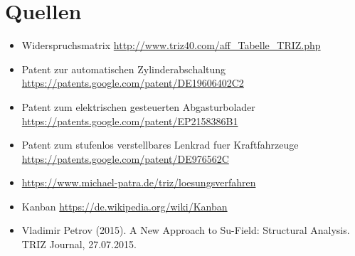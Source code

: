 \documentclass[11pt,a4paper]{article}
\begin{document}
\section{Quellen}

\begin{itemize}
\item {Widerspruchsmatrix}
  \url{http://www.triz40.com/aff_Tabelle_TRIZ.php}
\item {Patent zur automatischen Zylinderabschaltung}\\
  \url{https://patents.google.com/patent/DE19606402C2}
\item {Patent zum elektrischen gesteuerten Abgasturbolader}\\
	\url{https://patents.google.com/patent/EP2158386B1}
\item {Patent zum stufenlos verstellbares Lenkrad fuer Kraftfahrzeuge}\\
	\url{https://patents.google.com/patent/DE976562C}
\item \url{https://www.michael-patra.de/triz/loesungsverfahren}
\item {Kanban} \url{https://de.wikipedia.org/wiki/Kanban}
\item Vladimir Petrov (2015).  A New Approach to Su-Field: Structural
  Analysis.  TRIZ Journal, 27.07.2015. 
\end{itemize}
\end{document}

